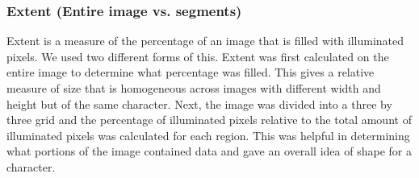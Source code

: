 \subsubsection{Extent (Entire image vs. segments)}
Extent is a measure of the percentage of an image that is filled with illuminated pixels.  We used two different forms of this.  Extent was first calculated on the entire image to determine what percentage was filled.  This gives a relative measure of size that is homogeneous across images with different width and height but of the same character.  Next, the image was divided into a three by three grid and the percentage of illuminated pixels relative to the total amount of illuminated pixels was calculated for each region.  This was helpful in determining what portions of the image contained data and gave an overall idea of shape for a character.
